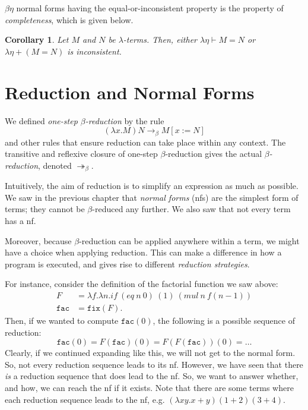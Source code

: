 \documentclass[a4paper, openany]{memoir}
\newtheorem{corollary}[proposition]{Corollary}
\theoremstyle{definition}
\begin{document}
    $\beta \eta$ normal forms having the equal-or-inconsistent property is the property of \emph{completeness}, which is given below.
    \begin{corollary}
        Let $M$ and $N$ be $\lambda$-terms. Then, either $\lambda \eta \vdash M = N$ or $\lambda \eta + (M = N)$ is inconsistent.
    \end{corollary}
    \newpage

    \section{Reduction and Normal Forms}
    We defined \emph{one-step $\beta$-reduction} by the rule
    \[(\lambda x.M) N \to_\beta M[x := N]\]
    and other rules that ensure reduction can take place within any context. The transitive and reflexive closure of one-step $\beta$-reduction gives the actual \emph{$\beta$-reduction}, denoted $\twoheadrightarrow_\beta$. 

    Intuitively, the aim of reduction is to simplify an expression as much as possible. We saw in the previous chapter that \emph{normal forms} (nfs) are the simplest form of terms; they cannot be $\beta$-reduced any further. We also saw that not every term has a nf.

    Moreover, because $\beta$-reduction can be applied anywhere within a term, we might have a choice when applying reduction. This can make a difference in how a program is executed, and gives rise to different \emph{reduction strategies}. 
    
    For instance, consider the definition of the factorial function we saw above:
    \begin{align*}
        F &= \lambda f.\lambda n.\textit{if} \ (\textit{eq} \ n \ 0) \ (1) \ (\textit{mul} \ n \ f(n-1)) \\
        \texttt{fac} &= \texttt{fix}(F).
    \end{align*}
    Then, if we wanted to compute $\texttt{fac}(0)$, the following is a possible sequence of reduction:
    \[\texttt{fac}(0) = F(\texttt{fac})(0) = F(F(\texttt{fac}))(0) = \dots \]
    Clearly, if we continued expanding like this, we will not get to the normal form. So, not every reduction sequence leads to its nf. However, we have seen that there \emph{is} a reduction sequence that does lead to the nf. So, we want to answer whether, and how, we can reach the nf if it exists. Note that there are some terms where each reduction sequence leads to the nf, e.g. $(\lambda xy. x + y)(1 + 2)(3 + 4)$.
\end{document}
